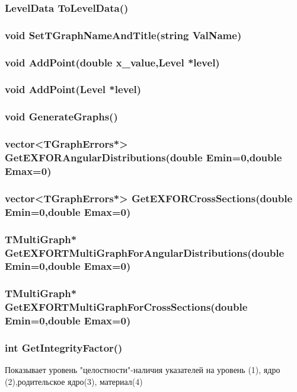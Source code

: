 \documentclass[a4paper,12pt]{extarticle}
\begin{document}
\subsubsection{LevelData ToLevelData()}

\subsubsection{void SetTGraphNameAndTitle(string ValName)}

\subsubsection{void AddPoint(double x\_value,Level *level)}

\subsubsection{void AddPoint(Level *level)}

\subsubsection{void GenerateGraphs()}

\subsubsection{vector<TGraphErrors*> GetEXFORAngularDistributions(double Emin=0,double Emax=0)}

\subsubsection{vector<TGraphErrors*> GetEXFORCrossSections(double Emin=0,double Emax=0)}

\subsubsection{TMultiGraph* GetEXFORTMultiGraphForAngularDistributions(double Emin=0,double Emax=0)}

\subsubsection{TMultiGraph* GetEXFORTMultiGraphForCrossSections(double Emin=0,double Emax=0)}

\subsubsection{int GetIntegrityFactor()}
Показывает уровень "целостности"-наличия указателей на уровень (1), ядро (2),родительское ядро(3), материал(4) 
\end{document}
